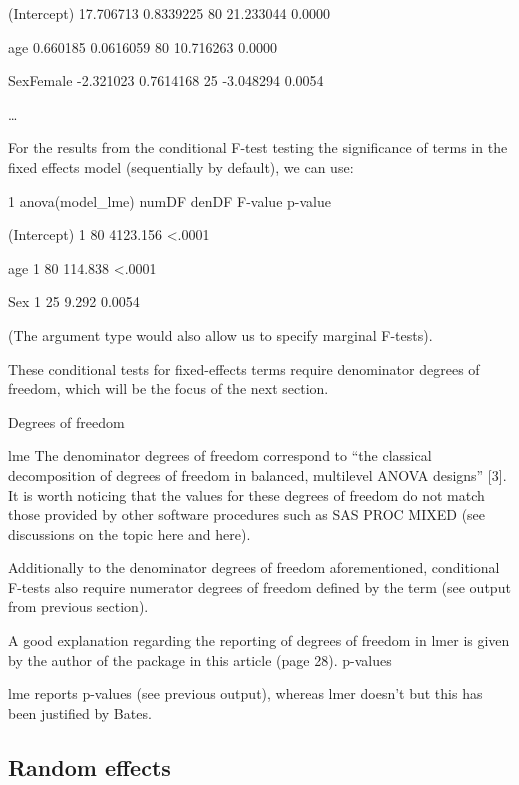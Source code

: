 \begin{itemize}
(Intercept)       17.706713   0.8339225    80     21.233044      0.0000

age                     0.660185   0.0616059   80     10.716263      0.0000

SexFemale        -2.321023   0.7614168    25     -3.048294      0.0054

…

For the results from the conditional F-test testing the significance of terms in the fixed effects model (sequentially by default), we can use:

1
anova(model_lme)
                         numDF      denDF      F-value    p-value

(Intercept)           1                80      4123.156    <.0001

age                       1               80      114.838     <.0001

Sex                       1               25        9.292       0.0054

(The argument type would also allow us to specify marginal F-tests).

These conditional tests for fixed-effects terms require denominator degrees of freedom, which will be the focus of the next section.



Degrees of freedom

lme
The denominator degrees of freedom correspond to “the classical decomposition of degrees of freedom in balanced, multilevel ANOVA designs” [3]. It is worth noticing that the values for these degrees of freedom do not match those provided by other software procedures such as SAS PROC MIXED (see discussions on the topic here and here).

Additionally to the denominator degrees of freedom aforementioned, conditional F-tests also require numerator degrees of freedom defined by the term (see output from previous section).

A good explanation regarding the reporting of degrees of freedom in lmer is given by the author of the package in this article (page 28).
p-values

lme reports p-values (see previous output), whereas
lmer doesn’t but this has been justified by Bates.



\subsection*{Random effects}


\end{itemize}
